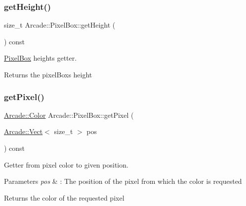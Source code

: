 \subsubsection{\texorpdfstring{get\+Height()}{getHeight()}}
{\footnotesize\ttfamily size\+\_\+t Arcade\+::\+Pixel\+Box\+::get\+Height (\begin{DoxyParamCaption}{ }\end{DoxyParamCaption}) const}



\hyperlink{class_arcade_1_1_pixel_box}{Pixel\+Box} height\textquotesingle{}s getter. 

\begin{DoxyReturn}{Returns}
the pixel\+Box\textquotesingle{}s height 
\end{DoxyReturn}
\mbox{\label{class_arcade_1_1_pixel_box_afbbc61f220999095290e62a6eb413301}} 
\subsubsection{\texorpdfstring{get\+Pixel()}{getPixel()}}
{\footnotesize\ttfamily \hyperlink{class_arcade_1_1_color}{Arcade\+::\+Color} Arcade\+::\+Pixel\+Box\+::get\+Pixel (\begin{DoxyParamCaption}\item[{\hyperlink{class_arcade_1_1_vect}{Arcade\+::\+Vect}$<$ size\+\_\+t $>$}]{pos }\end{DoxyParamCaption}) const}



Getter from pixel color to given position. 


\begin{DoxyParams}{Parameters}
{\em pos} & \+: The position of the pixel from which the color is requested \\
\hline
\end{DoxyParams}
\begin{DoxyReturn}{Returns}
the color of the requested pixel 
\end{DoxyReturn}
\mbox{\label{class_arcade_1_1_pixel_box_a85ebca9e42c237f806d00d510b504001}} 
